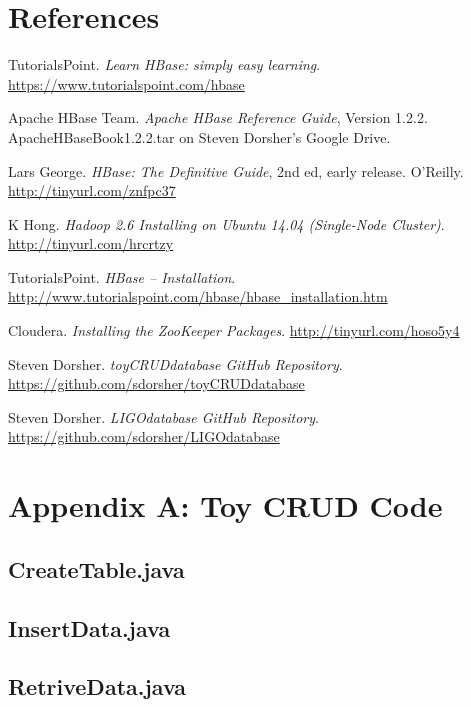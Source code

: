 \documentclass{article}
\begin{document}
\section{References}
\begin{thebibliography}{1}


 TutorialsPoint. {\it Learn HBase: simply easy learning}. \url{https://www.tutorialspoint.com/hbase}

 Apache HBase Team. {\it Apache HBase Reference Guide}, Version 1.2.2. ApacheHBaseBook1.2.2.tar on Steven Dorsher's Google Drive.

 Lars George. {\it HBase: The Definitive Guide}, 2nd ed, early release. O'Reilly. \url{http://tinyurl.com/znfpc37}

 K Hong. {\it Hadoop 2.6 Installing on Ubuntu 14.04 (Single-Node Cluster)}. \url{http://tinyurl.com/hrcrtzy}

 TutorialsPoint. {\it HBase -- Installation}. \url{http://www.tutorialspoint.com/hbase/hbase_installation.htm}

 Cloudera. {\it Installing the ZooKeeper Packages}.
\url{http://tinyurl.com/hoso5y4}

 Steven Dorsher. {\it toyCRUDdatabase GitHub Repository}. \url{https://github.com/sdorsher/toyCRUDdatabase}

 Steven Dorsher. {\it LIGOdatabase GitHub Repository}. \url{https://github.com/sdorsher/LIGOdatabase}
\end{thebibliography}

\section{Appendix A: Toy CRUD Code}
\subsection{CreateTable.java}

\subsection{InsertData.java}

\subsection{RetriveData.java}

\end{document}
